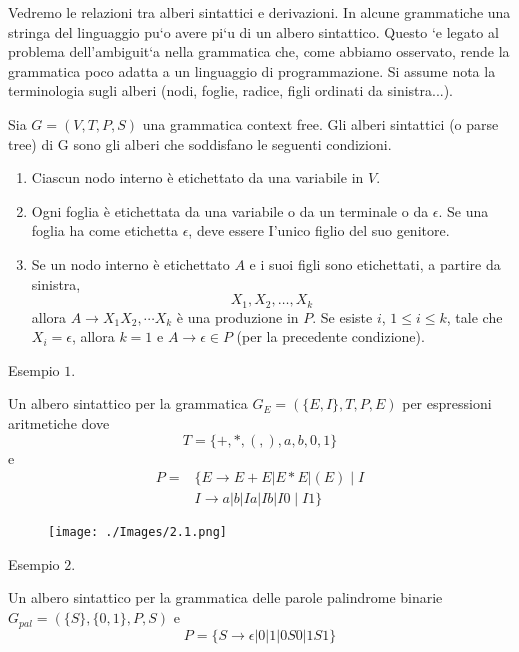 \vspace{5mm}

Vedremo le relazioni tra alberi sintattici e derivazioni.
In alcune grammatiche una stringa del linguaggio pu`o avere pi`u di un albero sintattico. Questo `e legato al problema dell’ambiguit`a nella grammatica che, come abbiamo osservato, rende la grammatica poco adatta a un linguaggio di programmazione.
Si assume nota la terminologia sugli alberi (nodi, foglie, radice, ﬁgli ordinati da sinistra...).

\vspace{5mm}

Sia $G=(V, T, P, S)$ una grammatica context free. Gli alberi sintattici (o parse tree) di G sono gli alberi che soddisfano le seguenti condizioni.
\begin{enumerate}
    \item Ciascun nodo interno è etichettato da una variabile in $V$.
    \item Ogni foglia è etichettata da una variabile o da un terminale o da $\epsilon$. Se una foglia ha come etichetta $\epsilon$, deve essere I'unico figlio del suo genitore.
    \item Se un nodo interno è etichettato $A$ e i suoi figli sono etichettati, a partire da sinistra,
$$
X_{1}, X_{2}, \ldots, X_{k}
$$
allora $A \rightarrow X_{1} X_{2}, \cdots X_{k}$ è una produzione in $P$. Se esiste $i$, $1 \leq i \leq k$, tale che $X_{i}=\epsilon$, allora $k=1$ e $A \rightarrow \epsilon \in P$ (per la precedente condizione).
\end{enumerate}


Esempio $1 .$

Un albero sintattico per la grammatica $G_{E}=(\{E, I\}, T, P, E)$ per espressioni aritmetiche dove
$$
T=\{+, *,(,), a, b, 0,1\}
$$
e
$$
\begin{aligned}
P=&\{E \rightarrow E+E|E * E|(E) \mid I\\
&I \rightarrow a|b| Ia|I b| I0 \mid I 1\}
\end{aligned}
$$

\begin{figure}[hbpt!]
    \centering
    \texttt{[image: ./Images/2.1.png]}
\end{figure}
\FloatBarrier

Esempio $2 .$

Un albero sintattico per la grammatica delle parole palindrome binarie $G_{p a l}=(\{S\},\{0,1\}, P, S)$ e
$$
P=\{S \rightarrow \epsilon|0| 1|0 S 0| 1 S 1\}
$$


